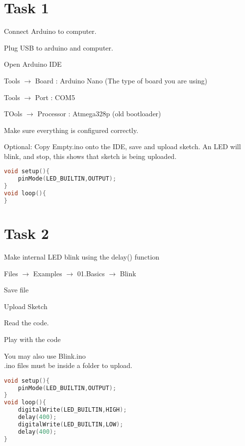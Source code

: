 \documentclass[12pt]{article}
\begin{document}
\section*{Task 1}
Connect Arduino to computer. 
\begin{todolist}
    \item Plug USB to arduino and computer. 
    \item Open Arduino IDE
    \item Tools $\rightarrow $ Board : Arduino Nano (The type of board you are using) 
    \item Tools $\rightarrow$ Port : COM5 
    \item TOols $\rightarrow$ Processor : Atmega328p (old bootloader) 
    \item Make sure everything is configured correctly. 
    \item Optional: Copy Empty.ino onto the IDE, save and upload sketch.  An LED will blink, and stop, this shows that sketch is being uploaded. 
\end{todolist}
\begin{lstlisting}[language=C++, caption={Empty.ino}]
void setup(){
    pinMode(LED_BUILTIN,OUTPUT);
}
void loop(){
}
\end{lstlisting}
\section*{Task 2} 
Make \color{red} internal LED \color{black} blink using the \color{blue} delay() \color{black}function\\
\begin{todolist}
    \item Files $\rightarrow$ Examples $\rightarrow$ 01.Basics $\rightarrow$ Blink
    \item Save file
    \item Upload Sketch
    \item Read the code. 
    \item Play with the code
\end{todolist}
You may also use Blink.ino \\
.ino files must be inside a folder to upload.
\begin{lstlisting}[language=C++, caption={Blink.ino}]
void setup(){
    pinMode(LED_BUILTIN,OUTPUT);
}
void loop(){
    digitalWrite(LED_BUILTIN,HIGH);
    delay(400);
    digitalWrite(LED_BUILTIN,LOW);
    delay(400);
}
\end{lstlisting}
\end{document}
